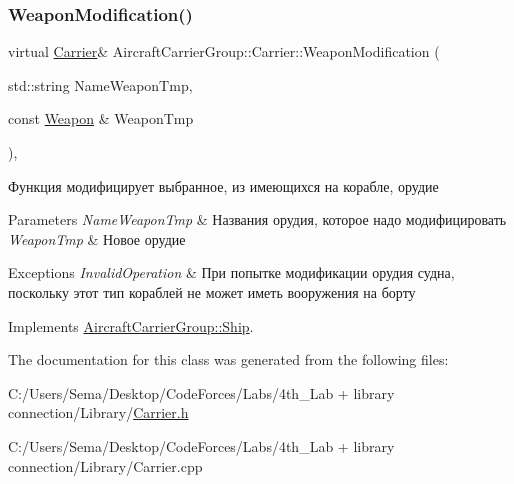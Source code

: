 \subsubsection{\texorpdfstring{Weapon\+Modification()}{WeaponModification()}}
{\footnotesize\ttfamily virtual \mbox{\hyperlink{class_aircraft_carrier_group_1_1_carrier}{Carrier}}\& Aircraft\+Carrier\+Group\+::\+Carrier\+::\+Weapon\+Modification (\begin{DoxyParamCaption}\item[{std\+::string}]{Name\+Weapon\+Tmp,  }\item[{const \mbox{\hyperlink{class_aircraft_carrier_group_1_1_weapon}{Weapon}} \&}]{Weapon\+Tmp }\end{DoxyParamCaption})\hspace{0.3cm}{\ttfamily [inline]}, {\ttfamily [virtual]}}



Функция модифицирует выбранное, из имеющихся на корабле, орудие 


\begin{DoxyParams}{Parameters}
{\em Name\+Weapon\+Tmp} & Названия орудия, которое надо модифицировать \\
\hline
{\em Weapon\+Tmp} & Новое орудие \\
\hline
\end{DoxyParams}

\begin{DoxyExceptions}{Exceptions}
{\em Invalid\+Operation} & При попытке модификации орудия судна, поскольку этот тип кораблей не может иметь вооружения на борту \\
\hline
\end{DoxyExceptions}


Implements \mbox{\hyperlink{class_aircraft_carrier_group_1_1_ship_a3f91c1ad2960c095cfd88e85df0a3990}{Aircraft\+Carrier\+Group\+::\+Ship}}.



The documentation for this class was generated from the following files\+:\begin{DoxyCompactItemize}
\item 
C\+:/\+Users/\+Sema/\+Desktop/\+Code\+Forces/\+Labs/4th\+\_\+\+Lab + library connection/\+Library/\mbox{\hyperlink{_carrier_8h}{Carrier.\+h}}\item 
C\+:/\+Users/\+Sema/\+Desktop/\+Code\+Forces/\+Labs/4th\+\_\+\+Lab + library connection/\+Library/Carrier.\+cpp\end{DoxyCompactItemize}
